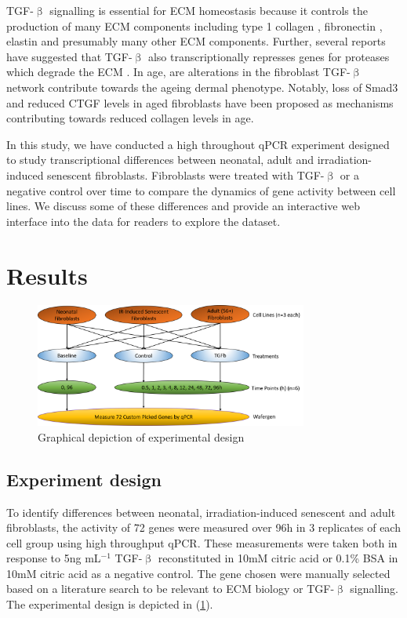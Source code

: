 \documentclass[alpha-refs]{wiley-article}
\newcommand{\tgf}{TGF-$\upbeta$}
\begin{document}
\tgf{} signalling is essential for ECM homeostasis because it controls the production of many ECM components including type 1 collagen \citep{Varani2006, Varga1987}, fibronectin \citep{Ignotz1986}, elastin \citep{Kuang2007} and presumably many other ECM components. Further, several reports have suggested that \tgf{} also transcriptionally represses genes for proteases which degrade the ECM \citep{White2000, Yuan2001, Edwards1996}. In age, are alterations in the fibroblast \tgf{} network contribute towards the ageing dermal phenotype. Notably, loss of Smad3 \citep{Purohit2016} and reduced CTGF levels in aged fibroblasts have been proposed as mechanisms contributing towards reduced collagen levels in age.

In this study, we have conducted a high throughout qPCR experiment designed to study transcriptional differences between neonatal, adult and irradiation-induced senescent fibroblasts. Fibroblasts were treated with \tgf{} or a negative control over time to compare the dynamics of gene activity between cell lines. We discuss some of these differences and provide an interactive web interface into the data for readers to explore the dataset. 
%
\section{Results}
\begin{figure}
	\centering
	\includegraphics[width=0.8\textwidth]{img/ExperimentDesign}
	\caption{Graphical depiction of experimental design}
	\label{fig:exp_design}
\end{figure}
\subsection{Experiment design}
To identify differences between neonatal, irradiation-induced senescent and adult fibroblasts, the activity of 72 genes were measured over 96h in 3 replicates of each cell group using high throughput qPCR. These measurements were taken both in response to 5ng mL$^{-1}$ \tgf{} reconstituted in 10mM citric acid or 0.1\% BSA in 10mM citric acid as a negative control. The gene chosen were manually selected based on a literature search to be relevant to ECM biology or \tgf{} signalling. The experimental design is depicted in (\cref{fig:exp_design}).
\end{document}
